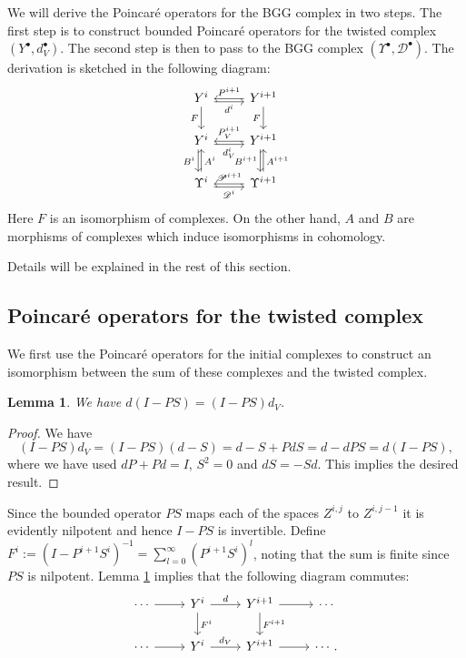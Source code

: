 \documentclass[11pt]{amsart}
\newtheorem{lemma}{Lemma}
\newcommand{\0}{\mathaccent23}
\newcommand{\bs}{{\scriptscriptstyle \bullet}}
\begin{document}
We will derive the Poincar\'e operators for the BGG complex in two steps. The first step is to construct bounded Poincar\'e operators for the twisted complex $(Y^{\bs}, d_{V}^{\bs})$. The second step is then to pass to the BGG complex $(\Upsilon^{\bs}, \mathscr{D}^{\bs})$. The derivation is sketched in the following diagram:
\begin{equation}\label{diagram-two-steps}
\begin{tikzcd}[swap]
Y^{i}\arrow{d}{ F} \arrow[r, "d^{i}", shift right=1] &\arrow{l}{P^{i+1}}Y^{i+1}\arrow{d}{ F}\\
Y^{i} \arrow[d, "B^{i}", shift right=1] \arrow[r, "d_{V}^{i}", shift right=1]&\arrow{l}{P_{V}^{i+1}}Y^{i+1}\arrow[d, "B^{i+1}", shift right=1] \\
\Upsilon^{i}\arrow[r, "\mathscr{D}^{i}", shift right=1]\arrow{u}{A^{i}}&\arrow{l}{\mathscr{P}^{i+1}}\Upsilon^{i+1}\arrow{u}{A^{i+1}}
\end{tikzcd}
\end{equation}
Here $F$ is an isomorphism of complexes. On the other hand, $A$ and $B$ are morphisms of complexes which induce isomorphisms in cohomology. 

Details will be explained in the rest of this section.

\subsection{Poincar\'e operators for the twisted complex}\label{sec:twisted}
We first use the Poincar\'e operators for the initial complexes to construct an isomorphism between the sum of these complexes and the twisted complex.

 \begin{lemma}\label{lem:I-PS}
We have $d(I-PS)=(I-PS)d_{V}$. 
 \end{lemma}
 \begin{proof}
We have
 $$
(I-PS)d_{V}= (I-PS)(d-S)=d-S+PdS=d-dPS=d(I-PS),
 $$
 where we have used $dP+Pd=I$, $S^{2}=0$ and  $dS=-Sd$. This implies the desired result.
 \end{proof}

Since the bounded operator $PS$ maps each of the spaces $Z^{i,j}$ to $Z^{i,j-1}$ it is evidently nilpotent and hence $I-PS$ is invertible. Define $F^{i}:=(I-P^{i+1}S^{i})^{-1}=\sum_{l=0}^{\infty}(P^{i+1}S^{i})^{l}$, noting that the sum is finite since $PS$ is nilpotent. Lemma \ref{lem:I-PS} implies that the following diagram commutes:
\begin{equation} \label{KddVK}
\begin{tikzcd}
\cdots \arrow{r}{} &Y^{i}\arrow{d}{F^{i}} \arrow{r}{d} &Y^{i+1} \arrow{d}{F^{i+1}}\arrow{r}{} & \cdots\\
\cdots \arrow{r}{} &Y^{i}\arrow{r}{d_{V}} &Y^{i+1}\arrow{r}{} & \cdots.
 \end{tikzcd}
\end{equation}
\end{document}
